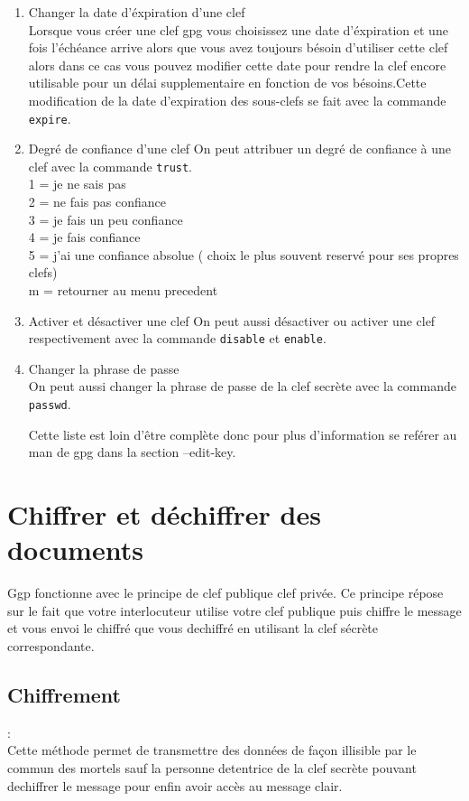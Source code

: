 \begin{enumerate}
\item Changer la date d'éxpiration d'une clef\\
Lorsque vous créer une clef gpg vous choisissez une date d'éxpiration et une fois l'échéance arrive alors que vous avez toujours bésoin 
d'utiliser cette clef alors dans ce cas vous pouvez modifier cette date pour rendre la clef encore utilisable pour un délai supplementaire
en fonction de vos bésoins.Cette modification  de la date d'expiration des sous-clefs se fait avec la commande  \texttt{expire}.

\item Degré de confiance d'une clef 
On peut attribuer un degré de confiance à une clef avec la commande \texttt{trust}.\\
  1 = je ne sais pas\\
  2 = ne fais pas confiance\\
  3 = je fais un peu confiance\\
  4 = je fais confiance\\
  5 = j'ai une confiance absolue ( choix le plus souvent reservé pour ses propres clefs)\\
  m = retourner au menu precedent\\
  

\item Activer et désactiver une clef
On peut aussi désactiver ou activer une clef respectivement avec la commande \texttt{disable} et \texttt{enable}.

\item Changer la phrase de passe\\
On peut aussi changer la phrase de passe de la clef secrète avec la commande \texttt{passwd}.


Cette liste est loin d'être complète donc pour plus d'information se reférer au man de gpg dans la section --edit-key.\\
\end{enumerate}
\section{Chiffrer et déchiffrer des documents}
  
Ggp fonctionne avec le principe de clef publique clef privée. Ce principe répose sur le fait que votre interlocuteur
utilise votre clef publique puis chiffre le message et vous envoi le chiffré que vous dechiffré en utilisant 
la clef sécrète correspondante.


\subsection {Chiffrement}:\\
Cette méthode permet de transmettre des données de façon illisible par le commun des mortels sauf la personne detentrice de la clef 
secrète pouvant dechiffrer le message pour enfin avoir accès au message clair.\\

